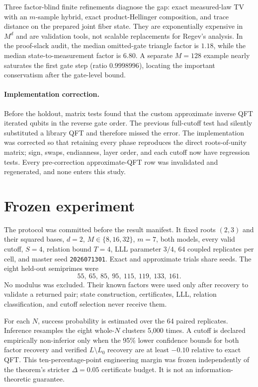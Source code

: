 \documentclass[10pt,twocolumn]{article}
\newcommand{\Lz}{L_0}
\begin{document}
Three factor-blind finite refinements diagnose the gap: exact measured-law
TV with an $m$-sample hybrid, exact product-Hellinger composition, and trace
distance on the prepared joint fiber state.  They are exponentially expensive
in $M^d$ and are validation tools, not scalable replacements for Regev's
analysis.  In the proof-slack audit, the median omitted-gate triangle factor is
$1.18$, while the median state-to-measurement factor is $6.80$.  A separate
$M=128$ example nearly saturates the first gate step (ratio $0.9998996$),
locating the important conservatism after the gate-level bound.

\paragraph{Implementation correction.}
Before the holdout, matrix tests found that the custom approximate inverse QFT
iterated qubits in the reverse gate order.  The previous full-cutoff test had
silently substituted a library QFT and therefore missed the error.  The
implementation was corrected so that retaining every phase reproduces the
direct roots-of-unity matrix; sign, swaps, endianness, layer order, and each
cutoff now have regression tests.  Every pre-correction approximate-QFT row
was invalidated and regenerated, and none enters this study.

\section{Frozen experiment}

The protocol was committed before the result manifest.  It fixed roots
$(2,3)$ and their squared bases, $d=2$, $M\in\{8,16,32\}$, $m=7$, both models,
every valid cutoff, $S=4$, relation bound $T=4$, LLL parameter $3/4$, 64
coupled replicates per cell, and master seed \texttt{2026071301}.  Exact and
approximate trials share seeds.  The eight held-out semiprimes were
\begin{equation*}
 55,\ 65,\ 85,\ 95,\ 115,\ 119,\ 133,\ 161.
\end{equation*}
No modulus was excluded.  Their known factors were used only after recovery
to validate a returned pair; state construction, certificates, LLL, relation
classification, and cutoff selection never receive them.

For each $N$, success probability is estimated over the 64 paired replicates.
Inference resamples the eight whole-$N$ clusters 5,000 times.  A cutoff is
declared empirically non-inferior only when the 95\% lower confidence bounds
for both factor recovery and verified $L\setminus\Lz$ recovery are at least
$-0.10$ relative to exact QFT.  This ten-percentage-point engineering margin
was frozen independently of the theorem's stricter $\Delta=0.05$ certificate
budget.  It is not an information-theoretic guarantee.
\end{document}
